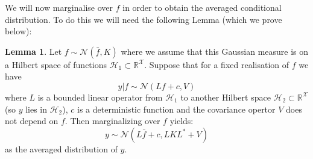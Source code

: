 \documentclass{article}
\theoremstyle{definition}
\newtheorem{lemma}[theorem]{Lemma}
\theoremstyle{remark}
\theoremstyle{remark}
\begin{document}
\noindent We will now marginalise over $f$ in order to obtain the averaged conditional distribution. To do this we will need the following Lemma (which we prove below): \vspace{10pt}
\begin{lemma}
    Let $f\sim\mathcal{N}(\bar{f},K)$ where we assume that this Gaussian measure is on a Hilbert space of functions $\mathcal{H}_{1}\subset\mathbb{R}^{\mathcal{X}}$. Suppose that for a fixed realisation of $f$ we have
    \begin{equation*}
        y|f\sim\mathcal{N}(Lf+c,V)
    \end{equation*}
    where $L$ is a bounded linear operator from $\mathcal{H}_{1}$ to another Hilbert space $\mathcal{H}_{2}\subset\mathbb{R}^{\mathcal{X}}$ (so $y$ lies in $\mathcal{H}_{2}$), $c$ is a deterministic function and the covariance opertor $V$ does not depend on $f$. Then marginalizing over $f$ yields:
    \begin{equation*}
        y\sim\mathcal{N}(L\bar{f}+c,LKL^{*}+V)
    \end{equation*}
    as the averaged distribution of $y$.
\end{lemma}
\end{document}
